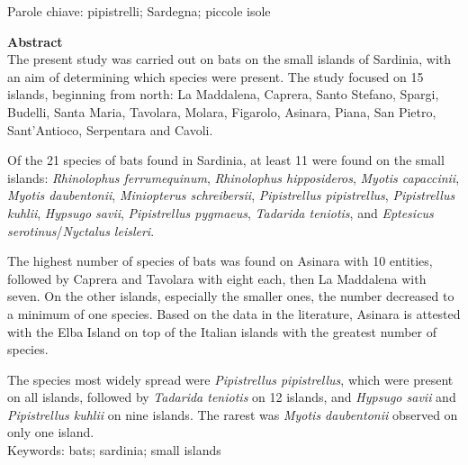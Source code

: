{{\footnotesize Parole chiave: pipistrelli; Sardegna; piccole isole}

\columnbreak

\textbf{Abstract}\\
The present study was carried out on bats on the small islands of Sardinia, with an aim of determining which species were present. The study focused on 15 islands, beginning from north: La Maddalena, Caprera, Santo Stefano, Spargi, Budelli, Santa Maria, Tavolara, Molara, Figarolo, Asinara, Piana, San Pietro, Sant'Antioco, Serpentara and Cavoli.

Of the 21 species of bats found in Sardinia, at least 11 were found on the small islands: \emph{Rhinolophus ferrumequinum}, \emph{Rhinolophus hipposideros}, \emph{Myotis capaccinii}, \emph{Myotis daubentonii}, \emph{Miniopterus schreibersii}, \emph{Pipistrellus pipistrellus}, \emph{Pipistrellus kuhlii}, \emph{Hypsugo savii}, \emph{Pipistrellus pygmaeus}, \emph{Tadarida teniotis}, and \emph{Eptesicus serotinus}/\emph{Nyctalus leisleri}.

The highest number of species of bats was found on Asinara with 10 entities, followed by Caprera and Tavolara with eight each, then La Maddalena with seven. On the other islands, especially the smaller ones, the number decreased to a minimum of one species. Based on the data in the literature, Asinara is attested with the Elba Island on top of the Italian islands with the greatest number of species.

The species most widely spread were \emph{Pipistrellus pipistrellus}, which were present on all islands, followed by \emph{Tadarida teniotis} on 12 islands, and \emph{Hypsugo savii} and \emph{Pipistrellus kuhlii} on nine islands. The rarest was \emph{Myotis daubentonii} observed on only one island.\\

{\footnotesize Keywords: bats; sardinia; small islands}

} %